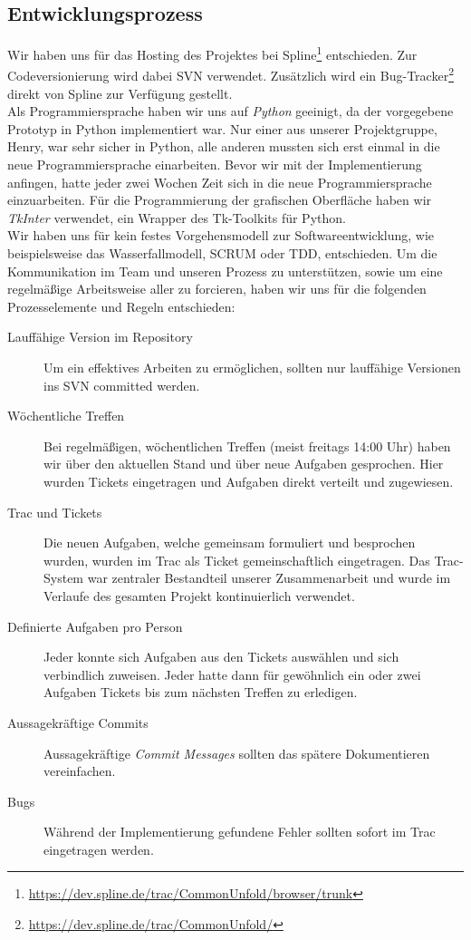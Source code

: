 \subsection{Entwicklungsprozess}
\label{subsec:prozess}

Wir haben uns für das Hosting des Projektes bei Spline\footnote{\url{https://dev.spline.de/trac/CommonUnfold/browser/trunk}} entschieden. Zur Codeversionierung wird dabei SVN verwendet. Zusätzlich wird ein Bug-Tracker\footnote{\url{https://dev.spline.de/trac/CommonUnfold/}} direkt von Spline zur Verfügung gestellt.\\

Als Programmiersprache haben wir uns auf \emph{Python} geeinigt, da der vorgegebene Prototyp in Python implementiert war. Nur einer aus unserer Projektgruppe, Henry, war sehr sicher in Python, alle anderen mussten sich erst einmal in die neue Programmiersprache einarbeiten. Bevor wir mit der Implementierung anfingen, hatte jeder zwei Wochen Zeit sich in die neue Programmiersprache einzuarbeiten. Für die Programmierung der grafischen Oberfläche haben wir \emph{TkInter} verwendet, ein Wrapper des Tk-Toolkits für Python.\\

Wir haben uns für kein festes Vorgehensmodell zur Softwareentwicklung, wie beispielsweise das Wasserfallmodell, SCRUM oder TDD, entschieden. Um die Kommunikation im Team und unseren Prozess zu unterstützen, sowie um eine regelmäßige Arbeitsweise aller zu forcieren, haben wir uns für die folgenden Prozesselemente und Regeln entschieden:

  \begin{description}
    \item[Lauffähige Version im Repository] Um ein effektives Arbeiten zu ermöglichen, sollten nur lauffähige Versionen ins SVN committed werden.
    \item[Wöchentliche Treffen] Bei regelmäßigen, wöchentlichen Treffen (meist freitags 14:00 Uhr) haben wir über den aktuellen Stand und über neue Aufgaben gesprochen. Hier wurden Tickets eingetragen und Aufgaben direkt verteilt und zugewiesen.
    \item[Trac und Tickets] Die neuen Aufgaben, welche gemeinsam formuliert und besprochen wurden, wurden im Trac als Ticket gemeinschaftlich eingetragen. Das Trac-System war zentraler Bestandteil unserer Zusammenarbeit und wurde im Verlaufe des gesamten Projekt kontinuierlich verwendet.
    \item[Definierte Aufgaben pro Person] Jeder konnte sich Aufgaben aus den Tickets auswählen und sich verbindlich zuweisen. Jeder hatte dann für gewöhnlich ein oder zwei Aufgaben \bzw Tickets bis zum nächsten Treffen zu erledigen.
    \item[Aussagekräftige Commits] Aussagekräftige \emph{Commit Messages} sollten das spätere Dokumentieren vereinfachen.
    \item[Bugs] Während der Implementierung gefundene Fehler sollten sofort im Trac eingetragen werden. 
  \end{description}

